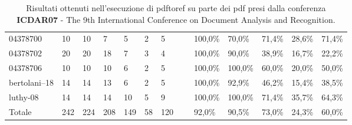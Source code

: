 \begin{table}
\begin{center}
\begin{tabular}{|l|l|l|l|l|l|l|l|l|l|l|l|l|}
04378700 & 10 & 10 & 7 & 5 & 2 & 5 & ~ & 100,0\% & 70,0\% & 71,4\% & 28,6\% & 71,4\%\\
04378702 & 20 & 20 & 18 & 7 & 3 & 4 & ~ & 100,0\% & 90,0\% & 38,9\% & 16,7\% & 22,2\%\\
04378706 & 10 & 10 & 10 & 6 & 2 & 5 & ~ & 100,0\% & 100,0\% & 60,0\% & 20,0\% & 50,0\%\\
bertolani--18 & 14 & 14 & 13 & 6 & 2 & 5 & ~ & 100,0\% & 92,9\% & 46,2\% & 15,4\% & 38,5\%\\
luthy-08 & 14 & 14 & 14 & 10 & 5 & 9 & ~ & 100,0\% & 100,0\% & 71,4\% & 35,7\% & 64,3\%\\ \hline
Totale & 242 & 224 & 208 & 149 & 58 & 120 & ~ & 92,0\% & 90,5\% & 73,0\% & 24,3\% & 60,0\%\\ \hline
	\end{tabular}
	\tiny{\caption{Risultati ottenuti nell'esecuzione di pdftoref su parte dei pdf presi dalla conferenza \textbf{ICDAR07} - The 9th International Conference on Document Analysis and Recognition. }}
	\end{center}
	\end{table}

